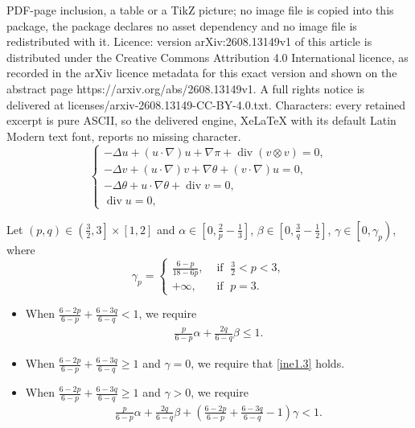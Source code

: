 \documentclass[10pt,a4paper]{amsart}
\DeclareMathOperator{\divg}{div}
\begin{document}
PDF-page inclusion, a table or a TikZ picture; no image file is copied into this package, the package declares no asset dependency and no image file is redistributed with it. Licence: version arXiv:2608.13149v1 of this article is distributed under the Creative Commons Attribution 4.0 International licence, as recorded in the arXiv licence metadata for this exact version and shown on the abstract page https://arxiv.org/abs/2608.13149v1. A full rights notice is delivered at licenses/arxiv-2608.13149-CC-BY-4.0.txt. Characters: every retained excerpt is pure ASCII, so the delivered engine, XeLaTeX with its default Latin Modern text font, reports no missing character.
\begin{equation}\label{equ1.1}
  \left\{
    \begin{array}{ll}
     -\Delta u+(u\cdot\nabla) u+\nabla \pi+\divg(v\otimes v)=0,  \\
   -\Delta v+(u\cdot\nabla) v+\nabla \theta+(v\cdot\nabla)u=0, \\
   -\Delta \theta+u\cdot\nabla\theta+\divg v=0,\\
     \divg u=0,
\end{array}
  \right.
\end{equation}

\begin{Assum}\label{a1.1}
Let $(p,q)\in\left(\frac{3}{2},3\right]\times[1,2]$ and $\alpha\in\left[0,\frac{2}{p}-\frac{1}{3}\right]$, $\beta\in\left[0,\frac{3}{q}-\frac{1}{2}\right]$, $\gamma\in\left[0,\gamma_p\right)$, where
\begin{equation*}
\gamma_p=
\begin{cases}
\frac{6-p}{18-6p}, & \text{ if }\;\frac{3}{2}<p<3, \\
+\infty, & \text{ if }\;p=3.
\end{cases}
\end{equation*}
\end{Assum}

\begin{Assum}\label{a1.2}
\begin{itemize}
\item[(i)] When $\frac{6-2p}{6-p} + \frac{6-3q}{6-q} < 1$, we require
\begin{align}\label{ine1.3}
\frac{p}{6-p}\alpha+\frac{2q}{6-q}\beta\leq1.
\end{align}
\item[(ii)] When $\frac{6-2p}{6-p} + \frac{6-3q}{6-q} \geq 1$ and $\gamma=0$, we require that \eqref{ine1.3} holds.
\item[(iii)] When $\frac{6-2p}{6-p} + \frac{6-3q}{6-q} \geq 1$ and $\gamma>0$, we require
 \begin{align}\label{ine1.6}
 \frac{p}{6-p}\alpha+\frac{2q}{6-q}\beta+\left(\frac{6-2p}{6-p}+\frac{6-3q}{6-q}-1\right)\gamma<1.
 \end{align}
\end{itemize}
\end{Assum}
\end{document}
